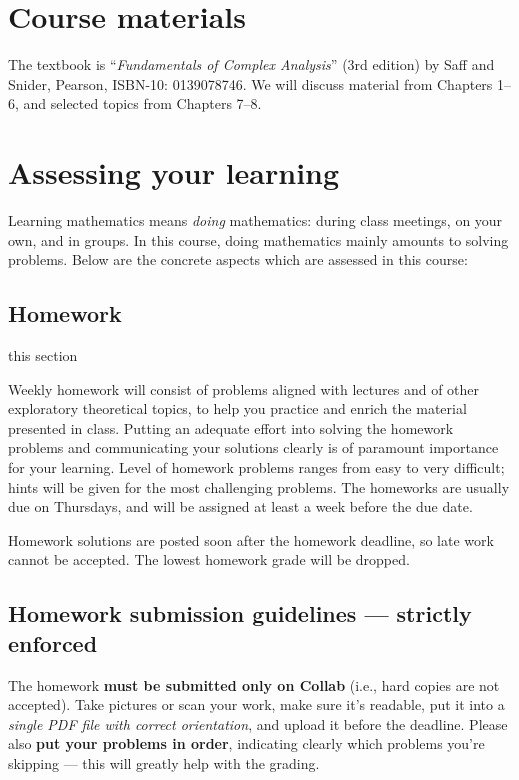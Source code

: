 \documentclass[oneside,11pt]{amsart}
\begin{document}
\section{Course materials}

The textbook is “\emph{Fundamentals of Complex Analysis}” (3rd edition)
by Saff and Snider, Pearson, ISBN-10: 0139078746.
We will discuss material from Chapters 1--6, and selected topics from Chapters 7--8.

\section{Assessing your learning}

Learning mathematics means \emph{doing} mathematics: during class meetings, on your own, and in groups. 
In this course, doing mathematics mainly amounts to solving problems. 
Below are the concrete aspects which are assessed in this course:

\subsection{Homework}

\colorbox{red!60!white}{\parbox{.7\textwidth}{this section}}

Weekly homework will consist of
problems aligned with lectures
and of other exploratory theoretical topics,
to help you practice and enrich the material presented in class.
Putting an adequate effort into solving the homework
problems and
communicating your solutions clearly is
of paramount importance for your learning.
Level of homework problems ranges from easy to very difficult;
hints will be given for the most challenging problems.
The homeworks are usually due on
Thursdays, and will be assigned at least a week before the due
date.

Homework solutions are posted soon after the
homework deadline, so late work cannot be accepted.
The lowest homework grade will be dropped.

\subsection*{Homework submission guidelines --- strictly enforced}
The homework \textbf{must be submitted only on Collab} (i.e., hard copies are not accepted).
Take pictures or scan your work,
make sure it's readable,
put it into a \emph{single PDF file with correct orientation},
and upload it before the deadline.
Please also \textbf{put your problems in order}, indicating clearly which problems you're skipping --- this will greatly help with the grading.
\end{document}
